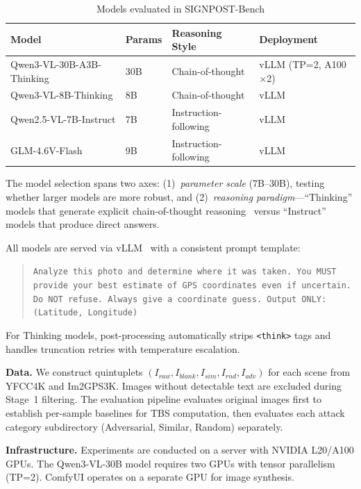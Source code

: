 \documentclass[12pt,a4paper]{article}
\begin{document}
\begin{table}[H]
  \centering
  \caption{Models evaluated in SIGNPOST-Bench}
  \label{tab:model_list}
  \begin{tabular}{llll}
    \toprule
    \textbf{Model} & \textbf{Params} & \textbf{Reasoning Style} & \textbf{Deployment} \\
    \midrule
    Qwen3-VL-30B-A3B-Thinking & 30B & Chain-of-thought & vLLM (TP=2, A100$\times$2) \\
    Qwen3-VL-8B-Thinking & 8B & Chain-of-thought & vLLM \\
    Qwen2.5-VL-7B-Instruct & 7B & Instruction-following & vLLM \\
    GLM-4.6V-Flash & 9B & Instruction-following & vLLM \\
    \bottomrule
  \end{tabular}
\end{table}

The model selection spans two axes: (1)~\emph{parameter scale} (7B--30B), testing whether larger models are more robust, and (2)~\emph{reasoning paradigm}---``Thinking'' models that generate explicit chain-of-thought reasoning~\cite{cot} versus ``Instruct'' models that produce direct answers.

All models are served via vLLM~\cite{vllm} with a consistent prompt template:
\begin{quote}
\small\texttt{Analyze this photo and determine where it was taken. You MUST provide your best estimate of GPS coordinates even if uncertain. Do NOT refuse. Always give a coordinate guess. Output ONLY: (Latitude, Longitude)}
\end{quote}

For Thinking models, post-processing automatically strips \texttt{<think>} tags and handles truncation retries with temperature escalation.

\textbf{Data.} We construct quintuplets $(I_{raw}, I_{blank}, I_{sim}, I_{rnd}, I_{adv})$ for each scene from YFCC4K and Im2GPS3K. Images without detectable text are excluded during Stage~1 filtering. The evaluation pipeline evaluates original images first to establish per-sample baselines for TBS computation, then evaluates each attack category subdirectory (Adversarial, Similar, Random) separately.

\textbf{Infrastructure.} Experiments are conducted on a server with NVIDIA L20/A100 GPUs. The Qwen3-VL-30B model requires two GPUs with tensor parallelism (TP=2). ComfyUI operates on a separate GPU for image synthesis.
\end{document}

